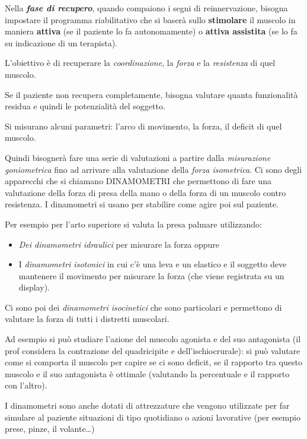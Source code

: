 \documentclass[]{article}
\begin{document}
Nella \textbf{\emph{fase di recupero}}, quando compaiono i segni di
reinnervazione, bisogna impostare il programma riabilitativo che si
baserà sullo \textbf{stimolare} il muscolo in maniera \textbf{attiva}
(se il paziente lo fa autonomamente) o \textbf{attiva assistita} (se lo
fa su indicazione di un terapista).

L'obiettivo è di recuperare la \emph{coordinazione}, la \emph{forza} e
la \emph{resistenza} di quel muscolo.

Se il paziente non recupera completamente, bisogna valutare quanta
funzionalità residua e quindi le potenzialità del soggetto.

Si misurano alcuni parametri: l'arco di movimento, la forza, il deficit
di quel muscolo.

Quindi bisognerà fare una serie di valutazioni a partire dalla
\emph{misurazione goniometrica} fino ad arrivare alla valutazione della
\emph{forza isometrica}. Ci sono degli apparecchi che si chiamano
DINAMOMETRI che permettono di fare una valutazione della forza di presa
della mano o della forza di un muscolo contro resistenza. I dinamometri
si usano per stabilire come agire poi sul paziente.

Per esempio per l'arto superiore si valuta la presa palmare utilizzando:

\begin{itemize}
\item
  \emph{Dei dinamometri idraulici} per misurare la forza oppure
\item
  I \emph{dinamometri isotonici} in cui c'è una leva e un elastico e il
  soggetto deve mantenere il movimento per misurare la forza (che viene
  registrata su un display).
\end{itemize}

Ci sono poi dei \emph{dinamometri isocinetici} che sono particolari e
permettono di valutare la forza di tutti i distretti muscolari.

Ad esempio si può studiare l'azione del muscolo agonista e del suo
antagonista (il prof considera la contrazione del quadricipite e
dell'ischiocrurale): si può valutare come si comporta il muscolo per
capire se ci sono deficit, se il rapporto tra questo muscolo e il suo
antagonista è ottimale (valutando la percentuale e il rapporto con
l'altro).

I dinamometri sono anche dotati di attrezzature che vengono utilizzate
per far simulare al paziente situazioni di tipo quotidiano o azioni
lavorative (per esempio prese, pinze, il volante\ldots{})
\end{document}
